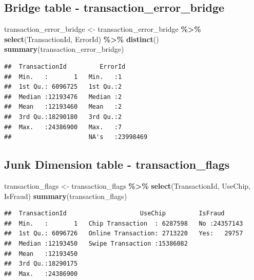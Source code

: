 \documentclass[
]{article}
\newenvironment{Shaded}{\begin{snugshade}}{\end{snugshade}}
\newcommand{\FunctionTok}[1]{\textcolor[rgb]{0.13,0.29,0.53}{\textbf{#1}}}
\newcommand{\NormalTok}[1]{#1}
\newcommand{\OtherTok}[1]{\textcolor[rgb]{0.56,0.35,0.01}{#1}}
\newcommand{\SpecialCharTok}[1]{\textcolor[rgb]{0.81,0.36,0.00}{\textbf{#1}}}
\begin{document}
\subsection{Bridge table -
transaction\_error\_bridge}\label{bridge-table---transaction_error_bridge}

\begin{Shaded}
\begin{Highlighting}[]
\NormalTok{transaction\_error\_bridge }\OtherTok{\textless{}{-}}\NormalTok{ transaction\_error\_bridge }\SpecialCharTok{\%\textgreater{}\%} 
  \FunctionTok{select}\NormalTok{(TransactionId, ErrorId) }\SpecialCharTok{\%\textgreater{}\%} \FunctionTok{distinct}\NormalTok{()}
\FunctionTok{summary}\NormalTok{(transaction\_error\_bridge)}
\end{Highlighting}
\end{Shaded}

\begin{verbatim}
##  TransactionId         ErrorId        
##  Min.   :       1   Min.   :1         
##  1st Qu.: 6096725   1st Qu.:2         
##  Median :12193476   Median :2         
##  Mean   :12193460   Mean   :2         
##  3rd Qu.:18290180   3rd Qu.:2         
##  Max.   :24386900   Max.   :7         
##                     NA's   :23998469
\end{verbatim}

\subsection{Junk Dimension table -
transaction\_flags}\label{junk-dimension-table---transaction_flags-1}

\begin{Shaded}
\begin{Highlighting}[]
\NormalTok{transaction\_flags }\OtherTok{\textless{}{-}}\NormalTok{ transaction\_flags }\SpecialCharTok{\%\textgreater{}\%} \FunctionTok{select}\NormalTok{(TransactionId, UseChip, IsFraud)   }
\FunctionTok{summary}\NormalTok{(transaction\_flags)}
\end{Highlighting}
\end{Shaded}

\begin{verbatim}
##  TransactionId                    UseChip         IsFraud       
##  Min.   :       1   Chip Transaction  : 6287598   No :24357143  
##  1st Qu.: 6096726   Online Transaction: 2713220   Yes:   29757  
##  Median :12193450   Swipe Transaction :15386082                 
##  Mean   :12193450                                               
##  3rd Qu.:18290175                                               
##  Max.   :24386900
\end{verbatim}
\end{document}
